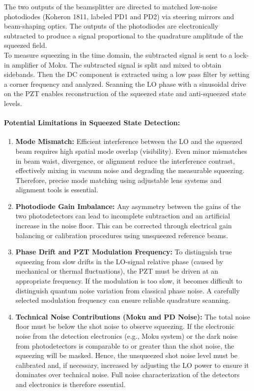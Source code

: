 \documentclass[colorlinks=true,pdfstartview=FitV,linkcolor=blue,
citecolor=red,urlcolor=magenta]{ligodoc}
\begin{document}
The two outputs of the beamsplitter are directed to matched low-noise photodiodes (Koheron 1811, labeled PD1 and PD2) via steering mirrors and beam-shaping optics. The outputs of the photodiodes are electronically subtracted to produce a signal proportional to the quadrature amplitude of the squeezed field.\\

To measure squeezing in the time domain, the subtracted signal is sent to a lock-in amplifier of Moku. The subtracted signal is split and mixed to obtain sidebands. Then the DC component is extracted using a low pass filter by setting a corner frequency and analyzed. Scanning the LO phase with a sinusoidal drive on the PZT enables reconstruction of the squeezed state and anti-squeezed state levels.

\paragraph{Potential Limitations in Squeezed State Detection:}
\begin{enumerate}
    \item \textbf{Mode Mismatch:} Efficient interference between the LO and the squeezed beam requires high spatial mode overlap (visibility). Even minor mismatches in beam waist, divergence, or alignment reduce the interference contrast, effectively mixing in vacuum noise and degrading the measurable squeezing. Therefore, precise mode matching using adjustable lens systems and alignment tools is essential.
    
    \item \textbf{Photodiode Gain Imbalance:} Any asymmetry between the gains of the two photodetectors can lead to incomplete subtraction and an artificial increase in the noise floor. This can be corrected through electrical gain balancing or calibration procedures using unsqueezed reference beams.
    
    \item \textbf{Phase Drift and PZT Modulation Frequency:} To distinguish true squeezing from slow drifts in the LO-signal relative phase (caused by mechanical or thermal fluctuations), the PZT must be driven at an appropriate frequency. If the modulation is too slow, it becomes difficult to distinguish quantum noise variation from classical phase noise. A carefully selected modulation frequency can ensure reliable quadrature scanning.
    
    \item \textbf{Technical Noise Contributions (Moku and PD Noise):} The total noise floor must be below the shot noise to observe squeezing. If the electronic noise from the detection electronics (e.g., Moku system) or the dark noise from photodetectors is comparable to or greater than the shot noise, the squeezing will be masked. Hence, the unsqueezed shot noise level must be calibrated and, if necessary, increased by adjusting the LO power to ensure it dominates over technical noise. Full noise characterization of the detectors and electronics is therefore essential.
\end{enumerate}
\end{document}
